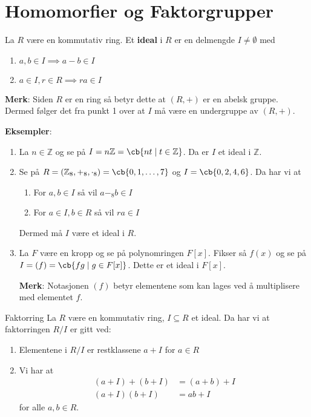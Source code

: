 \section{Homomorfier og Faktorgrupper}

\begin{definition}{}{}
	La $R$ være en kommutativ ring. Et \textbf{ideal} i $R$ er en delmengde $I \neq \emptyset$ med
	\begin{enumerate}
		\item $a,b\in I \implies a-b\in I$
		\item $a\in I, r\in R\implies ra\in I$
	\end{enumerate}
\end{definition}

\textbf{Merk}: Siden $R$ er en ring så betyr dette at $(R, +)$ er en abelsk gruppe. Dermed følger
det fra punkt 1 over at $I$ må være en undergruppe av $(R, +)$.

\textbf{Eksempler}:
\begin{enumerate}
	\item La $n\in \mathbb{Z}$ og se på $I=n \mathbb{Z} = \cb{nt\mid t\in \mathbb{Z}}$. Da er $I$ et
	      ideal i $\mathbb{Z}$.
	\item Se på $R=(\mathbb{Z}_8, +_8, \cdot_8)=\cb{0,1,\dots,7}$ og $I=\cb{0,2,4,6}$. Da har vi at
	      \begin{enumerate}
		      \item For $a,b\in I$ så vil $a-_8 b\in I$
		      \item For $a\in I, b\in R$ så vil $ra\in I$
	      \end{enumerate}
	      Dermed må $I$ være et ideal i $R$.
	\item La $F$ være en kropp og se på polynomringen $F[x]$. Fikser så $f(x)$ og se på
	      $I=(f)=\cb{fg\mid g\in F[x]}$. Dette er et ideal i $F[x]$.

	      \textbf{Merk}: Notasjonen $(f)$ betyr elementene som kan lages ved å multiplisere med
	      elementet $f$.
\end{enumerate}

\begin{definition}{Faktorring}{}
	La $R$ være en kommutativ ring, $I\subseteq R$ et ideal. Da har vi at faktorringen $R/I$ er gitt
	ved:
	\begin{enumerate}
		\item Elementene i $R/I$ er restklassene $a+I$ for $a\in R$
		\item Vi har at
		      \begin{align}
			      (a+I)+(b+I) & =(a+b)+I \\
			      (a+I)(b+I)  & =ab+I
		      \end{align}
		      for alle $a,b\in R$.
	\end{enumerate}
\end{definition}

